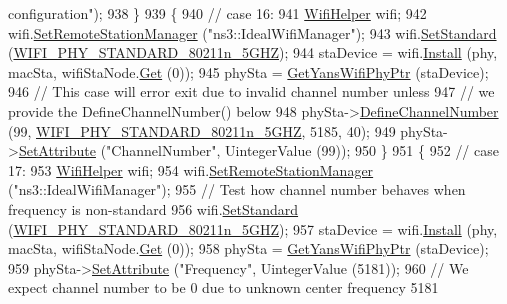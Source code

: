 \begin{DoxyCode}
{       configuration"});
938   \}
939   \{
940     \textcolor{comment}{// case 16:}
941     \hyperlink{classns3_1_1WifiHelper}{WifiHelper} wifi;
942     wifi.\hyperlink{classns3_1_1WifiHelper_a3d01b178aeb2de246ab5a3aa5638ce24}{SetRemoteStationManager} (\textcolor{stringliteral}{"ns3::IdealWifiManager"});
943     wifi.\hyperlink{classns3_1_1WifiHelper_aa54f3e61527ef8de318d310045bc5dfd}{SetStandard} (\hyperlink{group__wifi_gga1299834f4e1c615af3ca738033b76a49aaabe94a0be4668583c42595437b4a6c0}{WIFI\_PHY\_STANDARD\_80211n\_5GHZ});
944     staDevice = wifi.\hyperlink{classns3_1_1WifiHelper_a451b3d33fa1497c22f06c5451f57a127}{Install} (phy, macSta, wifiStaNode.\hyperlink{classns3_1_1NodeContainer_a9ed96e2ecc22e0f5a3d4842eb9bf90bf}{Get} (0));
945     phySta = \hyperlink{classSetChannelFrequencyTest_aa30a0a39f98c2d825152681ba8b9f4e1}{GetYansWifiPhyPtr} (staDevice);
946     \textcolor{comment}{// This case will error exit due to invalid channel number unless}
947     \textcolor{comment}{// we provide the DefineChannelNumber() below}
948     phySta->\hyperlink{classns3_1_1WifiPhy_a98bb7224e78132362285630d3c0597c9}{DefineChannelNumber} (99, 
      \hyperlink{group__wifi_gga1299834f4e1c615af3ca738033b76a49aaabe94a0be4668583c42595437b4a6c0}{WIFI\_PHY\_STANDARD\_80211n\_5GHZ}, 5185, 40);
949     phySta->\hyperlink{classns3_1_1ObjectBase_ac60245d3ea4123bbc9b1d391f1f6592f}{SetAttribute} (\textcolor{stringliteral}{"ChannelNumber"}, UintegerValue (99));
950   \}
951   \{
952     \textcolor{comment}{// case 17:}
953     \hyperlink{classns3_1_1WifiHelper}{WifiHelper} wifi;
954     wifi.\hyperlink{classns3_1_1WifiHelper_a3d01b178aeb2de246ab5a3aa5638ce24}{SetRemoteStationManager} (\textcolor{stringliteral}{"ns3::IdealWifiManager"});
955     \textcolor{comment}{// Test how channel number behaves when frequency is non-standard}
956     wifi.\hyperlink{classns3_1_1WifiHelper_aa54f3e61527ef8de318d310045bc5dfd}{SetStandard} (\hyperlink{group__wifi_gga1299834f4e1c615af3ca738033b76a49aaabe94a0be4668583c42595437b4a6c0}{WIFI\_PHY\_STANDARD\_80211n\_5GHZ});
957     staDevice = wifi.\hyperlink{classns3_1_1WifiHelper_a451b3d33fa1497c22f06c5451f57a127}{Install} (phy, macSta, wifiStaNode.\hyperlink{classns3_1_1NodeContainer_a9ed96e2ecc22e0f5a3d4842eb9bf90bf}{Get} (0));
958     phySta = \hyperlink{classSetChannelFrequencyTest_aa30a0a39f98c2d825152681ba8b9f4e1}{GetYansWifiPhyPtr} (staDevice);
959     phySta->\hyperlink{classns3_1_1ObjectBase_ac60245d3ea4123bbc9b1d391f1f6592f}{SetAttribute} (\textcolor{stringliteral}{"Frequency"}, UintegerValue (5181));
960     \textcolor{comment}{// We expect channel number to be 0 due to unknown center frequency 5181}

\end{DoxyCode}
